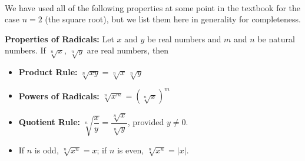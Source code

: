 \documentclass[12pt]{ximera}
\begin{document}
\[ \begin{array}{ccc}






&







&










\end{array}\]


We have used all of the following properties at some point in the textbook for the case $n=2$ (the square root), but we list them here in generality for completeness.

\smallskip


\begin{theorem}  \textbf{Properties of Radicals:} Let $x$ and $y$ be real numbers and $m$ and $n$ be natural numbers.  If $\sqrt[n]{x}$,  $\sqrt[n]{y}$ are real numbers, then 

\label{radicalprops}

\begin{itemize}

\item  \textbf{Product Rule:}  $\sqrt[n]{xy} = \sqrt[n]{x} \, \sqrt[n]{y}$ 

\item  \textbf{Powers of Radicals:} $\sqrt[n]{x^m} = \left(\sqrt[n]{x}\right)^m$ 

\item  \textbf{Quotient Rule:}  $\sqrt[n]{\dfrac{x}{y}} = \dfrac{\sqrt[n]{x}}{\sqrt[n]{y}}$, provided $y \neq 0$. 

\item  If $n$ is odd, $\sqrt[n]{x^n} = x$; if $n$ is even, $\sqrt[n]{x^n} = |x|$.

\end{itemize}

\end{theorem}
\end{document}
